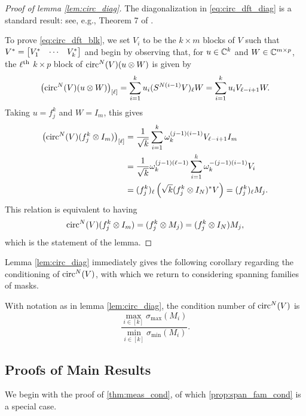 \begin{proof}[Proof of lemma \ref{lem:circ_diag}]
  The diagonalization in \eqref{eq:circ_dft_diag} is a standard result: see, e.g., Theorem 7 of \cite{gray2006circulant}.

  To prove \eqref{eq:circ_dft_blk}, we set $V_i$ to be the $k \times m$ blocks of $V$ such that $V^* = \begin{bmatrix} V^*_{1} & \cdots & V^*_{k} \end{bmatrix}$ and begin by observing that, for $u \in \mathbb{C}^k$ and $W \in \mathbb{C}^{m \times p}$, the $\ell^{\text{th}}$ $k \times p$ block of $\operatorname{circ}^N(V)(u \otimes W)$ is given by \[\left(\operatorname{circ}^N(V)(u \otimes W)\right)_{[\ell]} = \sum_{i = 1}^k u_i (S^{N (i - 1)}V)_\ell W = \sum_{i = 1}^k u_i V_{\ell - i + 1} W.\]  Taking $u = f_j^k$ and $W = I_m$, this gives \begin{align*} \left(\operatorname{circ}^N(V)(f_j^k \otimes I_m)\right)_{[\ell]} &= \frac{1}{\sqrt{k}}\sum_{i = 1}^k \omega_k^{(j - 1) (i - 1)} V_{\ell - i + 1} I_m \\ &= \frac{1}{\sqrt{k}} \omega_k^{(j - 1) (\ell - 1)} \sum_{i = 1}^k \omega_k^{-(j - 1)(i - 1)} V_i \\ &= (f_j^k)_\ell \left(\sqrt{k} (f_j^k \otimes I_N)^* V \right) = (f_j^k)_\ell M_j. \end{align*}  This relation is equivalent to having \[\operatorname{circ}^N(V) (f_j^k \otimes I_m) = (f_j^k \otimes M_j) = (f_j^k \otimes I_N) M_j,\] which is the statement of the lemma.
\end{proof}

Lemma \ref{lem:circ_diag} immediately gives the following corollary regarding the conditioning of $\operatorname{circ}^N(V)$, with which we return to considering spanning families of masks.

\begin{corollary}
  With notation as in lemma \ref{lem:circ_diag}, the condition number of $\operatorname{circ}^N(V)$ is \[\dfrac{\max\limits_{i \in [k]} \sigma_{\max} (M_i)}{\min\limits_{i \in [k]} \sigma_{\min} (M_i)}.\] \label{cor:circ_diag_condition}
\end{corollary}

\subsection{Proofs of Main Results}
\label{sec:gam_fam}
We begin with the proof of \cref{thm:meas_cond}, of which \cref{prop:span_fam_cond} is a special case.

